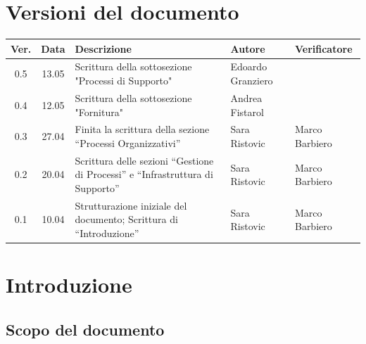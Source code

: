 \documentclass[12pt, a4paper]{article}
\begin{document}
\section*{Versioni del documento}
\begin{table}[h]
    \centering
    \renewcommand{\arraystretch}{1.3}
    \begin{tabularx}{\textwidth}{|c|c|X|l|l|}
        \hline
        \textbf{Ver.} & \textbf{Data} & \textbf{Descrizione} & \textbf{Autore} & \textbf{Verificatore} \\ \hline
        0.5 & 13.05 & Scrittura della sottosezione "Processi di Supporto" & Edoardo Granziero & \\ \hline
        0.4 & 12.05 & Scrittura della sottosezione "Fornitura" & Andrea Fistarol & \\ \hline
        0.3 & 27.04 & Finita la scrittura della sezione ``Processi Organizzativi'' & Sara Ristovic & Marco Barbiero \\ \hline
        0.2 & 20.04 & Scrittura delle sezioni ``Gestione di Processi'' e ``Infrastruttura di Supporto'' &
        Sara Ristovic &Marco Barbiero \\ \hline
        0.1 & 10.04 & Strutturazione iniziale del documento; Scrittura di ``Introduzione'' & Sara Ristovic & Marco Barbiero \\ \hline
        \end{tabularx}
\end{table}

\newpage


\tableofcontents
\iftotaltables  %
    \vspace{1cm}
    \listoftables
\fi

\iftotalfigures
    \vspace{1cm}
    \listoffigures
\fi
\newpage


\section{Introduzione}

\subsection{Scopo del documento}
\end{document}
